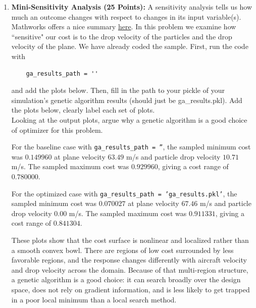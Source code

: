 \documentclass{article}
\begin{document}
\begin{enumerate}
\begin{answer}
The super-particle method reduces the computational cost by letting one tracked particle represent many physical droplets, but the trade-off is that the simulation no longer resolves fine-scale droplet-to-droplet variability exactly. In particular, it smooths out some stochastic detail and assumes the represented droplets behave collectively rather than independently.
\end{answer}


\newpage
\item[4.] \textbf{Mini-Sensitivity Analysis (25 Points):}
A sensitivity analysis tells us how much an outcome changes with respect to changes in its input variable(s). Mathworks offers a nice summary \href{https://www.mathworks.com/help/sldo/ug/what-is-sensitivity-analysis.html}{here}. In this problem we examine how ``sensitive" our cost is to the drop velocity of the particles and the drop velocity of the plane. We have already coded the sample. First, run the code with 
\begin{lstlisting}
    ga_results_path = ''
\end{lstlisting}
and add the plots below. Then, fill in the path to your pickle of your simulation's genetic algorithm results (should just be ga\_results.pkl). Add the plots below, clearly label each set of plots.\\
Looking at the output plots, argue why a genetic algorithm is a good choice of optimizer for this problem.

\begin{answer}
For the baseline case with \texttt{ga\_results\_path = ''}, the sampled minimum cost was $0.149960$ at plane velocity $63.49$ m/s and particle drop velocity $10.71$ m/s. The sampled maximum cost was $0.929960$, giving a cost range of $0.780000$.

For the optimized case with \texttt{ga\_results\_path = 'ga\_results.pkl'}, the sampled minimum cost was $0.070027$ at plane velocity $67.46$ m/s and particle drop velocity $0.00$ m/s. The sampled maximum cost was $0.911331$, giving a cost range of $0.841304$.

These plots show that the cost surface is nonlinear and localized rather than a smooth convex bowl. There are regions of low cost surrounded by less favorable regions, and the response changes differently with aircraft velocity and drop velocity across the domain. Because of that multi-region structure, a genetic algorithm is a good choice: it can search broadly over the design space, does not rely on gradient information, and is less likely to get trapped in a poor local minimum than a local search method.


\end{answer}
\end{enumerate}
\end{document}

